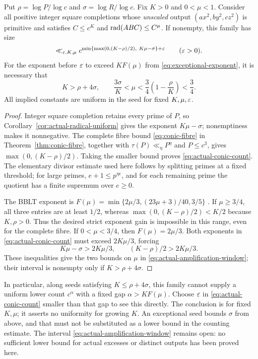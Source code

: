 \begin{theorem}
\label{thm:actual-amplification-window}
Put $\rho=\log P/\log c$ and $\sigma=\log R/\log c$.
Fix $K>0$ and $0<\mu<1$. Consider all positive integer square completions
whose \emph{unscaled} output $(ax^2,by^2,cz^2)$ is primitive and satisfies
$C\le c^K$ and $\operatorname{rad}(ABC)\le C^\mu$. If nonempty, this family has size
\begin{equation}\label{eq:actual-conic-count}
 \ll_{\varepsilon,K,\mu}
 c^{\min\{\max(0,(K-\rho)/2),\ K\mu-\sigma\}+\varepsilon}
 \qquad(\varepsilon>0).
\end{equation}
For the exponent before $\varepsilon$ to exceed $KF(\mu)$ from
\eqref{eq:exceptional-exponent}, it is necessary that
\begin{equation}\label{eq:actual-amplification-window}
 K>\rho+4\sigma,\qquad
 \frac{3\sigma}{K}<\mu<\frac34\left(1-\frac\rho K\right)<\frac34.
\end{equation}
All implied constants are uniform in the seed for fixed $K,\mu,\varepsilon$.
\end{theorem}
\begin{proof}
Integer square completion retains every prime of $P$, so
Corollary~\ref{cor:actual-radical-uniform} gives the exponent $K\mu-\sigma$;
nonemptiness makes it nonnegative. The complete fibre bound
\eqref{eq:conic-fibre} in Theorem~\ref{thm:conic-fibre}, together with
$\tau(P)\ll_\eta P^\eta$ and $P\le c^3$, gives
$\max(0,(K-\rho)/2)$. Taking the smaller bound proves
\eqref{eq:actual-conic-count}. The elementary divisor estimate used here
follows by splitting primes at a fixed threshold; for large primes,
$e+1\le p^{\eta e}$, and for each remaining prime the quotient has a
finite supremum over $e\ge0$.

The BBLT exponent is
$F(\mu)=\min\{2\mu/3,(23\mu+3)/40,3/5\}$ \cite{BBLT}.
If $\mu\ge3/4$, all three entries are at least $1/2$, whereas
$\max(0,(K-\rho)/2)<K/2$ because $K,\rho>0$. Thus the desired strict
exponent gain is impossible in this range, even for the complete fibre.
If $0<\mu<3/4$, then $F(\mu)=2\mu/3$. Both exponents in
\eqref{eq:actual-conic-count} must exceed $2K\mu/3$, forcing
\[
 K\mu-\sigma>2K\mu/3,\qquad (K-\rho)/2>2K\mu/3.
\]
These inequalities give the two bounds on $\mu$ in
\eqref{eq:actual-amplification-window}; their interval is nonempty only
if $K>\rho+4\sigma$.
\end{proof}

In particular, along seeds satisfying $K\le\rho+4\sigma$, this family
cannot supply a uniform lower count $c^\alpha$ with a fixed gap
$\alpha>KF(\mu)$. Choose $\varepsilon$ in \eqref{eq:actual-conic-count} smaller
than that gap to see this directly. The conclusion is for fixed $K,\mu$;
it asserts no uniformity for growing $K$. An exceptional seed bounds
$\sigma$ from above, and that must not be substituted as a lower bound
in the counting estimate. The interval
\eqref{eq:actual-amplification-window} remains open: no sufficient lower
bound for actual excesses or distinct outputs has been proved here.

